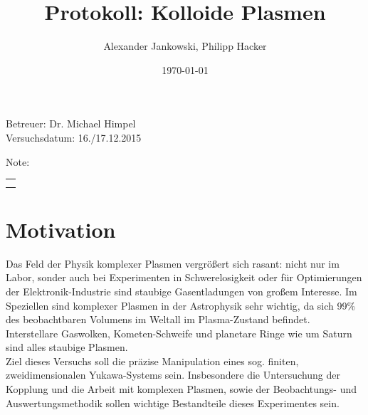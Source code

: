\documentclass[numbers=noenddot,a4paper,notitlepage,twoside,BCOR15mm]{scrartcl}
\title{Protokoll: Kolloide Plasmen} %
\author{Alexander Jankowski, Philipp Hacker}
\date{\today}
\begin{document}
	\maketitle
	\begin{center}
		Betreuer: Dr. Michael Himpel\\ %
		Versuchsdatum: 16./17.12.2015 \\ %
		\begin{table}[h]
			\centering
			Note: %
			\begin{tabularx}{1.5cm}{|X|}
				\hline \\ \\
				\hline
			\end{tabularx}
		\end{table}
	\end{center}
	\vspace*{\fill}
	\tableofcontents
	\vfill
	\newpage
	\section{Motivation}

		Das Feld der Physik komplexer Plasmen vergrößert sich rasant: nicht nur im Labor, sonder auch bei Experimenten in Schwerelosigkeit oder für Optimierungen der Elektronik-Industrie sind staubige Gasentladungen von großem Interesse. Im Speziellen sind komplexer Plasmen in der Astrophysik sehr wichtig, da sich 99\% des beobachtbaren Volumens im Weltall im Plasma-Zustand befindet. Interstellare Gaswolken, Kometen-Schweife und planetare Ringe wie um Saturn sind alles staubige Plasmen.\\
		Ziel dieses Versuchs soll die präzise Manipulation eines sog. finiten, zweidimensionalen Yukawa-Systems sein. Insbesondere die Untersuchung der Kopplung und die Arbeit mit komplexen Plasmen, sowie der Beobachtungs- und Auswertungsmethodik sollen wichtige Bestandteile dieses Experimentes sein.
\end{document}
